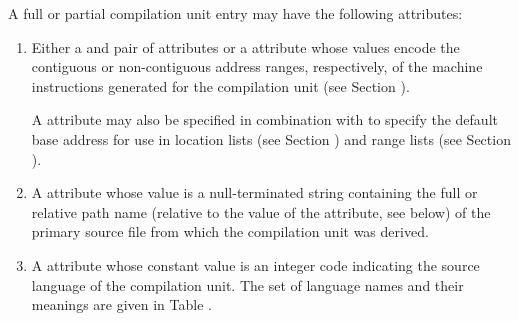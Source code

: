 A full or partial compilation unit entry 
may have the following attributes:
\begin{enumerate}[1. ]
\item Either a \DWATlowpc{} and 
\DWAThighpc{} pair of
attributes 
or 
a 
\DWATranges{} attribute
whose values encode 
the contiguous or 
non-contiguous address ranges, respectively,
of the machine instructions generated for the compilation
unit (see Section ).
  
A \DWATlowpc{} attribute 
may also be specified in combination 
with 
\DWATranges{} to specify the
default base address for use in 
location lists (see Section
) and range lists 
(see Section ).

\item \hypertarget{chap:DWATnamepathnameofcompilationsource}{}
A \DWATnameDEFN{} attribute 
whose value is a null-terminated string 
containing the full or relative path name 
(relative to the value of the \DWATcompdir{} attribute, 
see below) of the primary
source file from which the compilation unit was derived.

\item \hypertarget{chap:DWATlanguageprogramminglanguage}{}
A \DWATlanguageDEFN{} attribute
whose constant value is an integer code 
indicating the source language of the compilation
unit. The set of language names and their meanings are given
in Table .


\end{enumerate}
